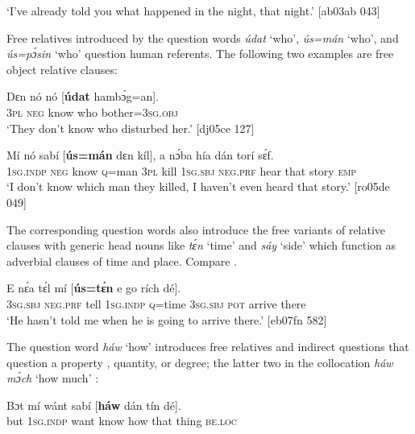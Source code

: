 \glt ‘I’ve already told you what happened in the night, that night.’ [ab03ab 043]
\z

Free relatives introduced by the question words \textit{údat} ‘who’, \textit{ús=mán} ‘who’, and \textit{ús=pɔ́sin} ‘who’ question human referents. The following two examples are free object relative clauses:


\ea%
    \label{ex:key:1451}
    \gll Dɛn  nó  nó    [\textbf{údat}  hambɔ́g=an].\\
\textsc{3pl}  \textsc{neg}  know   \phantom{[}who  bother=\textsc{3sg.obj}\\

\glt ‘They don’t know who disturbed her.’ [dj05ce 127]
\z


\ea%
    \label{ex:key:1452}
    \gll Mí    nó  sabí    [\textbf{ús=mán}  dɛn  kíl],    a    nɔ́ba  hía
dán    torí    sɛ́f.\\
\textsc{1sg.indp}  \textsc{neg}  know   \phantom{[}\textsc{q}=man  \textsc{3pl}  kill    \textsc{1sg.sbj}  \textsc{neg}.\textsc{prf}  hear
that    story  \textsc{emp}\\

\glt ‘I don’t know which man they killed, I haven’t even heard that 
story.’ [ro05de 049]
\z

The corresponding question words also introduce the free variants of relative clauses with generic head nouns like \textit{tɛ́n} ‘time’ and \textit{sáy} ‘side’ which function as adverbial clauses of time and place. Compare . 


\ea%
    \label{ex:key:1453}
    \gll E    nɛ́a    tɛ́l  mí    [\textbf{ús=tɛ́n}  e    go  rích    dé].\\
\textsc{3sg.sbj}  \textsc{neg}.\textsc{prf}  tell  \textsc{1sg.indp}   \phantom{[}\textsc{q}=time  \textsc{3sg.sbj}  \textsc{pot}  arrive  there\\

\glt ‘He hasn’t told me when he is going to arrive there.’ [eb07fn 582]
\z

The question word \textit{háw} ‘how’ introduces free relatives and indirect questions that question a property , quantity, or degree; the latter two in the collocation \textit{háw mɔ́ch} ‘how much’ :


\ea%
    \label{ex:key:1454}
    \gll Bɔt  mí    wánt  sabí    [\textbf{háw}  dán    tín    dé].\\
but  \textsc{1sg.indp}  want  know   \phantom{[}how  that    thing  \textsc{be.loc}\\

